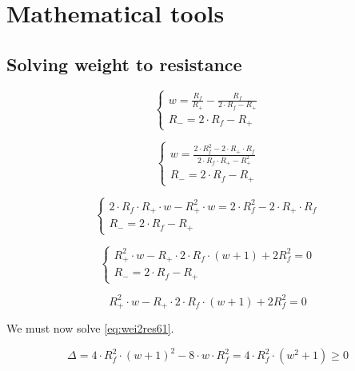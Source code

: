 \chapter{Mathematical tools}
\label{ap:other}
\clearpage

\section{Solving weight to resistance}\label{apsec:wei2res}

\begin{equation}\label{eq:wei2res3}
  \begin{cases}
    w=\frac{R_f}{R_+}-\frac{R_f}{2\cdot R_f -R_+}\\
    R_-=2\cdot R_f -R_+
  \end{cases}
\end{equation}


\begin{equation}\label{eq:wei2res4}
  \begin{cases}
    w=\frac{2\cdot R_f^2-2\cdot R_+\cdot R_f}{2\cdot R_f\cdot R_+ -R_+^2}\\
    R_-=2\cdot R_f -R_+
  \end{cases}
\end{equation}

\begin{equation}\label{eq:wei2res5}
  \begin{cases}
    2\cdot R_f\cdot R_+\cdot w -R_+^2\cdot w=2\cdot R_f^2-2\cdot R_+\cdot R_f\\
    R_-=2\cdot R_f -R_+
  \end{cases}
\end{equation}

\begin{equation}\label{eq:wei2res6}
  \begin{cases}
    R_+^2\cdot w - R_+\cdot 2\cdot R_f \cdot(w+1) + 2R_f^2 = 0\\
    R_-=2\cdot R_f -R_+
  \end{cases}
\end{equation}

\begin{equation}\label{eq:wei2res61}
  R_+^2\cdot w - R_+\cdot 2\cdot R_f \cdot(w+1) + 2R_f^2 = 0
\end{equation}

We must now solve \cref{eq:wei2res61}.

\begin{equation}\label{eq:wei2res61}
  \Delta = 4\cdot R_f^2\cdot(w+1)^2-8\cdot w\cdot R_f^2 = 4\cdot R_f^2\cdot(w^2+1) \ge 0
\end{equation}

